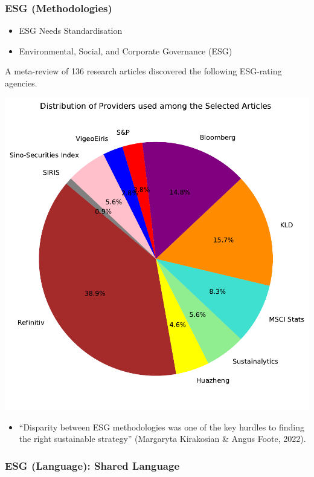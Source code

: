 \documentclass[
  letterpaper,
  DIV=11,
  numbers=noendperiod]{scrartcl}
\providecommand{\tightlist}{%
  \setlength{\itemsep}{0pt}\setlength{\parskip}{0pt}}\usepackage{longtable,booktabs,array}
\begin{document}
\subsubsection{ESG (Methodologies)}\label{esg-methodologies}

\begin{itemize}
\tightlist
\item
  ESG Needs Standardisation
\item
  Environmental, Social, and Corporate Governance (ESG)
\end{itemize}

A meta-review of 136 research articles discovered the following
ESG-rating agencies.

\includegraphics{_thesis_files/figure-pdf/cell-56-output-1.pdf}

\begin{itemize}
\tightlist
\item
  ``Disparity between ESG methodologies was one of the key hurdles to
  finding the right sustainable strategy'' (Margaryta Kirakosian \&
  Angus Foote, 2022).
\end{itemize}

\subsubsection{ESG (Language): Shared
Language}\label{esg-language-shared-language}
\end{document}
